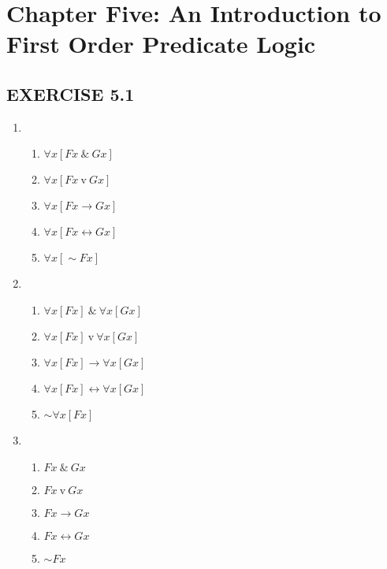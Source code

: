 \documentclass[a4paper,12pt]{article}
\newcommand{\ra}{\rightarrow}
\newcommand{\lra}{\leftrightarrow}
\newcommand{\s}{\sim}
\newcommand{\tv}{\textrm{v}}
\newcommand{\all}{\forall}
\begin{document}
    \newpage

    \section*{Chapter Five: An Introduction to First Order Predicate Logic}

    \subsection*{EXERCISE 5.1}

    \begin{enumerate}[label=\arabic*,leftmargin=*]
        \item
            \nopagebreak
            \begin{enumerate}[label=(\roman*)]
                \item $\all x [Fx \ \& \ Gx]$
                \item $\all x [Fx \ \tv \ Gx]$
                \item $\all x [Fx \ra Gx]$
                \item $\all x [Fx \lra Gx]$
                \item $\all x [\s Fx]$
            \end{enumerate}
        \item
            \nopagebreak
            \begin{enumerate}[label=(\roman*)]
                \item $\all x [Fx] \ \& \ \all x [Gx]$
                \item $\all x [Fx] \ \tv \ \all x [Gx]$
                \item $\all x [Fx] \ra \all x [Gx]$
                \item $\all x [Fx] \lra \all x [Gx]$
                \item $\s \all x [Fx]$
            \end{enumerate}
        \item
            \nopagebreak
            \begin{enumerate}[label=(\roman*)]
                \item $Fx \ \& \ Gx$
                \item $Fx \ \tv \ Gx$
                \item $Fx \ra Gx$
                \item $Fx \lra Gx$
                \item $\s Fx$
            \end{enumerate}
    \end{enumerate}
\end{document}
